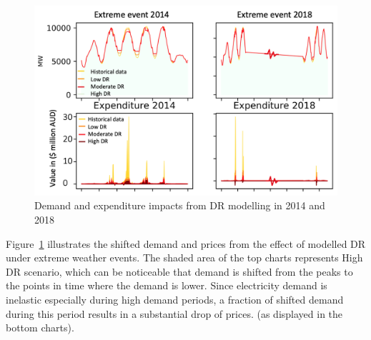 \documentclass{pasa}%
\begin{document}
\begin{figure}
\begin{center}
\includegraphics[width=.9\textwidth,height=.6\textheight,keepaspectratio]{DR/PASA_example/Figures_DR/extreme_4grids.png}
\caption{Demand and expenditure impacts from DR modelling in  2014 and 2018}\label{fig:Figdemandexpense}
\end{center}
\end{figure}

Figure~\ref{fig:Figdemandexpense} illustrates the shifted demand and prices from the effect of modelled DR under extreme weather events. The shaded area of the top charts represents High DR scenario, which can be noticeable that demand is shifted from the peaks to the points in time where the demand is lower. Since electricity demand is inelastic especially during high demand periods, a fraction of shifted demand during this period results in a substantial drop of prices. (as displayed in the bottom charts).
\end{document}
